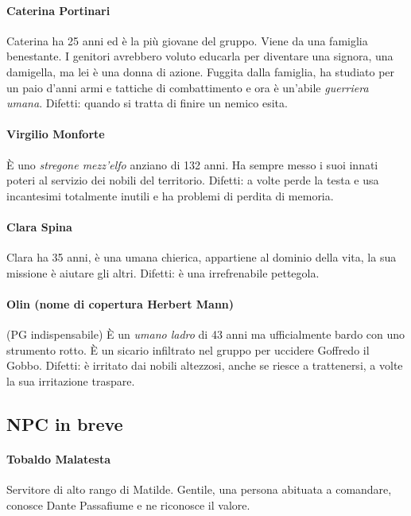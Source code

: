 \documentclass[letterpaper,twocolumn,openany,nodeprecatedcode]{dndbook}
\begin{document}
\paragraph{Caterina Portinari} Caterina ha 25 anni ed è la più giovane del gruppo. Viene da una famiglia benestante. I genitori avrebbero voluto educarla per diventare una signora, una damigella, ma lei è una donna di azione. Fuggita dalla famiglia, ha studiato per un paio d'anni armi e tattiche di combattimento e ora è un'abile \textit{guerriera umana}. Difetti: quando si tratta di finire un nemico esita.

\paragraph{Virgilio Monforte} È uno \textit{stregone mezz'elfo} anziano di 132 anni. Ha sempre messo i suoi innati poteri al servizio dei nobili del territorio. Difetti: a volte perde la testa e usa incantesimi totalmente inutili e ha problemi di perdita di memoria.

\paragraph{Clara Spina} Clara ha 35 anni, è una umana chierica, appartiene al dominio della vita, la sua missione è aiutare gli altri. Difetti: è una irrefrenabile pettegola.

\paragraph{Olin (nome di copertura Herbert Mann)} (PG indispensabile) È un \textit{umano ladro} di 43 anni ma ufficialmente bardo con uno strumento rotto. È un sicario infiltrato nel gruppo per uccidere Goffredo il Gobbo. Difetti: è irritato dai nobili altezzosi, anche se riesce a trattenersi, a volte la sua irritazione traspare.




\subsection{NPC in breve}

\paragraph{Tobaldo Malatesta} Servitore di alto rango di Matilde. Gentile, una persona abituata a comandare, conosce Dante Passafiume e ne riconosce il valore.
\end{document}
